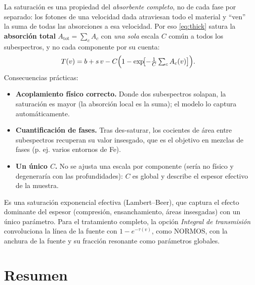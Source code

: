 La saturación es una propiedad del \emph{absorbente completo}, no de cada fase por
separado: los fotones de una velocidad dada atraviesan todo el material y ``ven''
la suma de todas las absorciones a esa velocidad. Por eso \eqref{eq:thick} satura
la \textbf{absorción total} $A_{\text{tot}}=\sum_c A_c$ con \emph{una sola} escala
$C$ común a todos los subespectros, y no cada componente por su cuenta:
\begin{equation}
  T(v) = b + s\,v - C\Bigl(1 - \exp\!\bigl[-\tfrac{1}{C}\textstyle\sum_c A_c(v)\bigr]\Bigr).
\end{equation}
Consecuencias prácticas:
\begin{itemize}[leftmargin=*]
  \item \textbf{Acoplamiento físico correcto.} Donde dos subespectros solapan, la
        saturación es mayor (la absorción local es la suma); el modelo lo captura
        automáticamente.
  \item \textbf{Cuantificación de fases.} Tras des-saturar, los cocientes de área
        entre subespectros recuperan su valor insesgado, que es el objetivo en
        mezclas de fases (p. ej. varios entornos de Fe).
  \item \textbf{Un único $C$.} No se ajusta una escala por componente (sería
        no físico y degeneraría con las profundidades): $C$ es global y describe el
        espesor efectivo de la muestra.
\end{itemize}

\begin{nota}
Es una saturación exponencial efectiva (Lambert–Beer), que captura el efecto
dominante del espesor (compresión, ensanchamiento, áreas insesgadas) con un único
parámetro. Para el tratamiento completo, la opción \emph{Integral de transmisión}
convoluciona la línea de la fuente con $1-e^{-\tau(v)}$, como NORMOS, con la
anchura de la fuente y su fracción resonante como parámetros globales.
\end{nota}

\section{Resumen}

